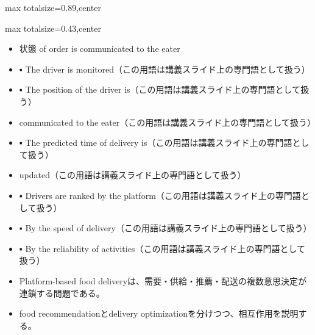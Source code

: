 \begin{minipage}[t]{0.58\textwidth}
\begin{adjustbox}{max totalsize={\textwidth}{0.89\textheight},center}
\begin{minipage}{\textwidth}
\end{minipage}
\end{adjustbox}
\end{minipage}


\clearpage
{}
\begin{minipage}[t]{0.405\textwidth}
\begin{adjustbox}{max totalsize={\textwidth}{0.43\textheight},center}
\begin{minipage}{\textwidth}\scriptsize
{}\begin{itemize}
\item 状態 of order is communicated to the eater
\item ▪ The driver is monitored（この用語は講義スライド上の専門語として扱う）
\item ▪ The position of the driver is（この用語は講義スライド上の専門語として扱う）
\item communicated to the eater（この用語は講義スライド上の専門語として扱う）
\item ▪ The predicted time of delivery is（この用語は講義スライド上の専門語として扱う）
\item updated（この用語は講義スライド上の専門語として扱う）
\item ▪ Drivers are ranked by the platform（この用語は講義スライド上の専門語として扱う）
\item ▪ By the speed of delivery（この用語は講義スライド上の専門語として扱う）
\item ▪ By the reliability of activities（この用語は講義スライド上の専門語として扱う）
\end{itemize}\begin{itemize}
\item Platform-based food deliveryは、需要・供給・推薦・配送の複数意思決定が連鎖する問題である。
\item food recommendationとdelivery optimizationを分けつつ、相互作用を説明する。
\end{itemize}
\end{minipage}
\end{adjustbox}
\end{minipage}\hfill
